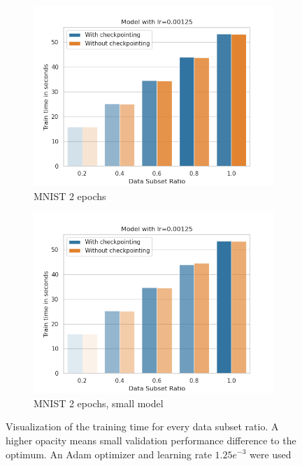 \begin{figure}[h]
\begin{subfigure}[b]{0.24\textwidth}
        \centering
        \includegraphics[width=\textwidth]{figures/22_07/2ep/train_subset_0.00125.png}
        \caption{MNIST 2 epochs}
        \label{fig:1111111111111111111111c}
    \end{subfigure}
    \begin{subfigure}[b]{0.24\textwidth}
        \centering
        \includegraphics[width=\textwidth]{figures/22_07/2ep_smaller/train_subset_0.00125.png}
        \caption{MNIST 2 epochs, small model}
        \label{fig:11d}
    \end{subfigure}
    \caption{Visualization of the training time for every data subset ratio. A higher opacity means small validation performance difference to the optimum. An Adam optimizer and learning rate $1.25e^{-3}$ were used}
    \label{fig:11}
\end{figure}